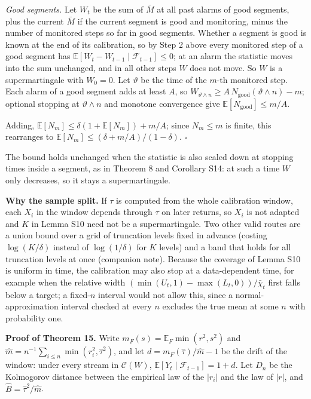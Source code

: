 \documentclass[
]{article}
\begin{document}
\emph{Good segments.} Let \(W_t\) be the sum of \(\bar M\) at all past
alarms of good segments, plus the current \(\bar M\) if the current
segment is good and monitoring, minus the number of monitored steps so
far in good segments. Whether a segment is good is known at the end of
its calibration, so by Step 2 above every monitored step of a good
segment has \(\mathbb{E}[W_t - W_{t-1} \mid \mathcal{F}_{t-1}] \le 0\);
at an alarm the statistic moves into the sum unchanged, and in all other
steps \(W\) does not move. So \(W\) is a supermartingale with
\(W_0 = 0\). Let \(\vartheta\) be the time of the \(m\)-th monitored
step. Each alarm of a good segment adds at least \(A\), so
\(W_{\vartheta \wedge n} \ge A\,N_{\mathrm{good}}(\vartheta \wedge n) - m\);
optional stopping at \(\vartheta \wedge n\) and monotone convergence
give \(\mathbb{E}[N_{\mathrm{good}}] \le m/A\).

Adding, \(\mathbb{E}[N_m] \le \delta(1 + \mathbb{E}[N_m]) + m/A\); since
\(N_m \le m\) is finite, this rearranges to
\(\mathbb{E}[N_m] \le (\delta + m/A)/(1 - \delta)\). \(\square\)

The bound holds unchanged when the statistic is also scaled down at
stopping times inside a segment, as in Theorem 8 and Corollary S14: at
such a time \(W\) only decreases, so it stays a supermartingale.

\textbf{Why the sample split.} If \(\tau\) is computed from the whole
calibration window, each \(X_i\) in the window depends through \(\tau\)
on later returns, so \(X_i\) is not adapted and \(K\) in Lemma S10 need
not be a supermartingale. Two other valid routes are a union bound over
a grid of truncation levels fixed in advance (costing \(\log(K/\delta)\)
instead of \(\log(1/\delta)\) for \(K\) levels) and a band that holds
for all truncation levels at once (companion note). Because the coverage
of Lemma S10 is uniform in time, the calibration may also stop at a
data-dependent time, for example when the relative width
\((\min(U_t,1) - \max(L_t,0))/\bar \chi_t\) first falls below a target;
a fixed-\(n\) interval would not allow this, since a
normal-approximation interval checked at every \(n\) excludes the true
mean at some \(n\) with probability one.

\textbf{Proof of Theorem 15.} Write
\(m_F(s) = \mathbb{E}_F\min(r^2, s^2)\) and
\(\hat m = n^{-1}\sum_{i \le n}\min(r_i^2, \hat\tau^2)\), and let
\(d = m_F(\hat\tau)/\hat m - 1\) be the drift of the window: under every
stream in \(\mathcal{C}(W)\),
\(\mathbb{E}[Y_t \mid \mathcal{F}_{t-1}] = 1 + d\). Let \(D_n\) be the
Kolmogorov distance between the empirical law of the
\(\lvert r_i\rvert\) and the law of \(\lvert r\rvert\), and
\(\hat B = \hat\tau^2/\hat m\).
\end{document}
